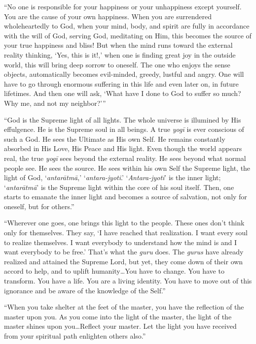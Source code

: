\enquote{No one is responsible for your happiness or your unhappiness except yourself. You are the cause of your own happiness. When you are surrendered wholeheartedly to God, when your mind, body, and spirit are fully in accordance with the will of God, serving God, meditating on Him, this becomes the source of your true happiness and bliss! But when the mind runs toward the external reality thinking, \enquote{Yes, this is it!,} when one is finding great joy in the outside world, this will bring deep sorrow to oneself. The one who enjoys the sense objects, automatically becomes evil-minded, greedy, lustful and angry. One will have to go through enormous suffering in this life and even later on, in future lifetimes. And then one will ask, \enquote{What have I done to God to suffer so much? Why me, and not my neighbor?}}

\enquote{God is the Supreme light of all lights. The whole universe is illumined by His effulgence. He is the Supreme soul in all beings. A true \textit{yogī} is ever conscious of such a God. He sees the Ultimate as His own Self. He remains constantly absorbed in His Love, His Peace and His light. Even though the world appears real, the true \textit{yogī} sees beyond the external reality. He sees beyond what normal people see. He sees the source. He sees within his own Self the Supreme light, the light of God, \enquote{\textit{antarātmā},} \enquote{\textit{antara-jyoti}.} \enquote{\textit{Antara-jyoti}} is the inner light; \enquote{\textit{antarātmā}} is the Supreme light within the core of his soul itself. Then, one starts to emanate the inner light and becomes a source of salvation, not only for oneself, but for others.}

\enquote{Wherever one goes, one brings this light to the people. These ones don’t think only for themselves. They say, \enquote{I have reached that realization. I want every soul to realize themselves. I want everybody to understand how the mind is and I want everybody to be free.} That’s what the \textit{guru} does. The \textit{gurus} have already realized and attained the Supreme Lord, but yet, they come down of their own accord to help, and to uplift humanity\ldots You have to change. You have to transform. You have a life. You are a living identity. You have to move out of this ignorance and be aware of the knowledge of the Self.}

\enquote{When you take shelter at the feet of the master, you have the reflection of the master upon you. As you come into the light of the master, the light of the master shines upon you\ldots Reflect your master. Let the light you have received from your spiritual path enlighten others also.}

